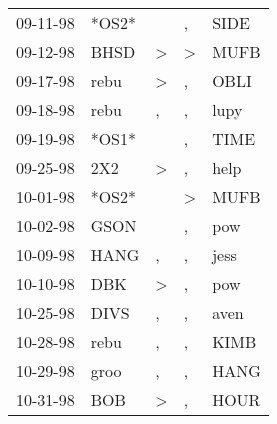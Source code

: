 \begin{supertabular}{p{0.07\textwidth}p{0.06\textwidth}p{0.02\textwidth}p{0.02\textwidth}p{0.06\textwidth}}
 09-11-98\textsuperscript{} &                            *OS2* &                  &             , &           SIDE\textsuperscript{} \\
 09-12-98\textsuperscript{} &           BHSD\textsuperscript{} &     \textgreater &  \textgreater &           MUFB\textsuperscript{} \\
 09-17-98\textsuperscript{} &           rebu\textsuperscript{} &     \textgreater &             , &           OBLI\textsuperscript{} \\
 09-18-98\textsuperscript{} &           rebu\textsuperscript{} &                , &             , &           lupy\textsuperscript{} \\
 09-19-98\textsuperscript{} &                            *OS1* &                  &             , &           TIME\textsuperscript{} \\
 09-25-98\textsuperscript{} &            2X2\textsuperscript{} &     \textgreater &             , &           help\textsuperscript{} \\
 10-01-98\textsuperscript{} &                            *OS2* &                  &  \textgreater &           MUFB\textsuperscript{} \\
 10-02-98\textsuperscript{} &           GSON\textsuperscript{} &                  &             , &            pow\textsuperscript{} \\
 10-09-98\textsuperscript{} &           HANG\textsuperscript{} &                , &             , &           jess\textsuperscript{} \\
 10-10-98\textsuperscript{} &            DBK\textsuperscript{} &     \textgreater &             , &            pow\textsuperscript{} \\
 10-25-98\textsuperscript{} &           DIVS\textsuperscript{} &                , &             , &           aven\textsuperscript{} \\
 10-28-98\textsuperscript{} &           rebu\textsuperscript{} &                , &             , &           KIMB\textsuperscript{} \\
 10-29-98\textsuperscript{} &           groo\textsuperscript{} &                , &             , &           HANG\textsuperscript{} \\
 10-31-98\textsuperscript{} &            BOB\textsuperscript{} &     \textgreater &             , &           HOUR\textsuperscript{} \\

\end{supertabular}
